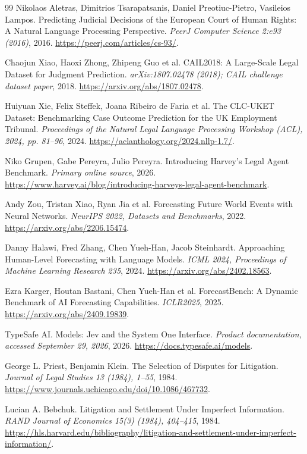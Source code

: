 \documentclass[11pt]{article}
\begin{document}
\begin{thebibliography}{99}
 Nikolaos Aletras, Dimitrios Tsarapatsanis, Daniel Preotiuc-Pietro, Vasileios Lampos. Predicting Judicial Decisions of the European Court of Human Rights: A Natural Language Processing Perspective. \emph{PeerJ Computer Science 2:e93 (2016)}, 2016. \url{https://peerj.com/articles/cs-93/}.

 Chaojun Xiao, Haoxi Zhong, Zhipeng Guo et al. CAIL2018: A Large-Scale Legal Dataset for Judgment Prediction. \emph{arXiv:1807.02478 (2018); CAIL challenge dataset paper}, 2018. \url{https://arxiv.org/abs/1807.02478}.

 Huiyuan Xie, Felix Steffek, Joana Ribeiro de Faria et al. The CLC-UKET Dataset: Benchmarking Case Outcome Prediction for the UK Employment Tribunal. \emph{Proceedings of the Natural Legal Language Processing Workshop (ACL), 2024, pp. 81--96}, 2024. \url{https://aclanthology.org/2024.nllp-1.7/}.

 Niko Grupen, Gabe Pereyra, Julio Pereyra. Introducing Harvey's Legal Agent Benchmark. \emph{Primary online source}, 2026. \url{https://www.harvey.ai/blog/introducing-harveys-legal-agent-benchmark}.

 Andy Zou, Tristan Xiao, Ryan Jia et al. Forecasting Future World Events with Neural Networks. \emph{NeurIPS 2022, Datasets and Benchmarks}, 2022. \url{https://arxiv.org/abs/2206.15474}.

 Danny Halawi, Fred Zhang, Chen Yueh-Han, Jacob Steinhardt. Approaching Human-Level Forecasting with Language Models. \emph{ICML 2024, Proceedings of Machine Learning Research 235}, 2024. \url{https://arxiv.org/abs/2402.18563}.

 Ezra Karger, Houtan Bastani, Chen Yueh-Han et al. ForecastBench: A Dynamic Benchmark of AI Forecasting Capabilities. \emph{ICLR2025}, 2025. \url{https://arxiv.org/abs/2409.19839}.

 TypeSafe AI. Models: Jev and the System One Interface. \emph{Product documentation, accessed September 29, 2026}, 2026. \url{https://docs.typesafe.ai/models}.

 George L. Priest, Benjamin Klein. The Selection of Disputes for Litigation. \emph{Journal of Legal Studies 13 (1984), 1--55}, 1984. \url{https://www.journals.uchicago.edu/doi/10.1086/467732}.

 Lucian A. Bebchuk. Litigation and Settlement Under Imperfect Information. \emph{RAND Journal of Economics 15(3) (1984), 404--415}, 1984. \url{https://hls.harvard.edu/bibliography/litigation-and-settlement-under-imperfect-information/}.


\end{thebibliography}
\end{document}
